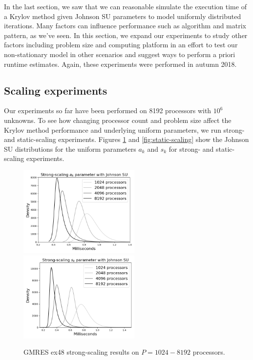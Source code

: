 \documentclass[sigconf, anonymous]{acmart}
\begin{document}
In the last section, we saw that we can reasonable simulate the execution time of a Krylov method given Johnson SU parameters to model uniformly distributed iterations. 
Many factors can influence performance such as algorithm and matrix pattern, as we've seen. 
In this section, we expand our experiments to study other factors including problem size and computing platform in an effort to test our non-stationary model in other scenarios and suggest ways to perform a priori runtime estimates.
Again, these experiments were performed in autumn 2018. 

\subsection{Scaling experiments}\label{sec:scaling}


Our experiments so far have been performed on 8192 processors with $10^6$ unknowns.
To see how changing processor count and problem size affect the Krylov method performance and underlying uniform parameters, we run strong- and static-scaling experiments.
Figures \ref{fig:strong-scaling} and \ref{fig:static-scaling} show the Johnson SU distributions for the uniform parameters $a_k$ and $s_k$ for strong- and static-scaling experiments. 


\begin{figure}[t]
\centering
\includegraphics[width=6cm]{../plots/GMRES_ex48_1000000_a_k_strong_scaling_johnsonsu.png}
\includegraphics[width=6cm]{../plots/PGMRES_ex48_1000000_s_k_strong_scaling_johnsonsu.png} 
\caption{GMRES ex48 strong-scaling results on $P = 1024 - 8192$ processors.} \label{fig:strong-scaling}
\end{figure}
 
\end{document}
